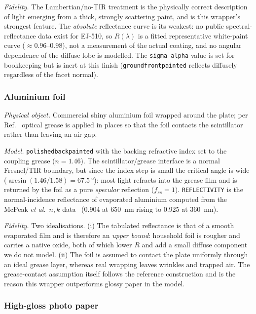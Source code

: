 \documentclass[11pt,a4paper]{article}
\begin{document}
\emph{Fidelity.} The Lambertian/no-TIR treatment is the physically correct
description of light emerging from a thick, strongly scattering paint, and is
this wrapper's strongest feature. The \emph{absolute} reflectance curve is its
weakest: no public spectral-reflectance data exist for EJ-510, so $R(\lambda)$
is a fitted representative white-paint curve ($\approx 0.96$--$0.98$), not a
measurement of the actual coating, and no angular dependence of the diffuse
lobe is modelled. The \texttt{sigma\_alpha} value is set for bookkeeping but is
inert at this finish (\texttt{groundfrontpainted} reflects diffusely regardless
of the facet normal).

\subsubsection{Aluminium foil}
\label{sec:refl-al}

\emph{Physical object.} Commercial shiny aluminium foil wrapped around the
plate; per Ref.~\cite{Rao2025} optical grease is applied in places so that the
foil contacts the scintillator rather than leaving an air gap.

\emph{Model.} \texttt{polishedbackpainted} with the backing refractive index set
to the coupling grease ($n=1.46$). The scintillator/grease interface is a normal
Fresnel/TIR boundary, but since the index step is small the critical angle is
wide ($\arcsin(1.46/1.58)=\SI{67.5}{\degree}$): most light refracts into the
grease film and is returned by the foil as a pure \emph{specular} reflection
($f_{ss}=1$). \texttt{REFLECTIVITY} is the normal-incidence reflectance of
evaporated aluminium computed from the McPeak \emph{et al.}~$n,k$
data~\cite{McPeak2015} (\num{0.904} at \SI{650}{\nano\meter} rising to
\num{0.925} at \SI{360}{\nano\meter}).

\emph{Fidelity.} Two idealisations. (i) The tabulated reflectance is that of a
smooth evaporated film and is therefore an \emph{upper bound}: household foil is
rougher and carries a native oxide, both of which lower $R$ and add a small
diffuse component we do not model. (ii) The foil is assumed to contact the plate
uniformly through an ideal grease layer, whereas real wrapping leaves wrinkles
and trapped air. The grease-contact assumption itself follows the reference
construction and is the reason this wrapper outperforms glossy paper in the
model.

\subsubsection{High-gloss photo paper}
\label{sec:refl-glossy}
\end{document}
